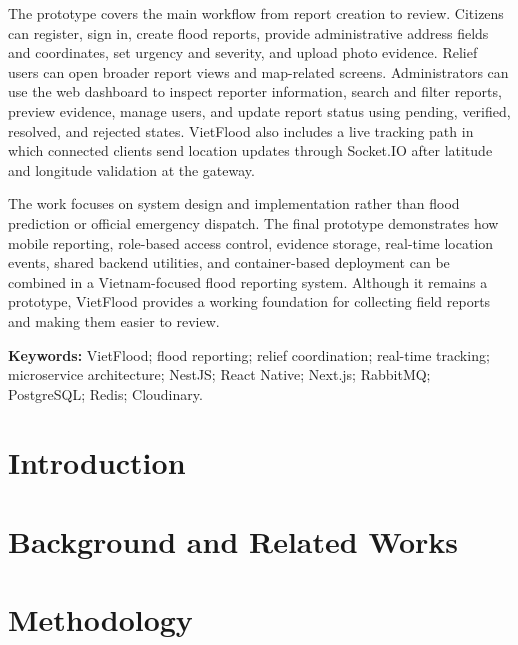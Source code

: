 \documentclass[12pt, twoside]{report}
\begin{document}
The prototype covers the main workflow from report creation to review. Citizens can register, sign in, create flood reports, provide administrative address fields and coordinates, set urgency and severity, and upload photo evidence. Relief users can open broader report views and map-related screens. Administrators can use the web dashboard to inspect reporter information, search and filter reports, preview evidence, manage users, and update report status using pending, verified, resolved, and rejected states. VietFlood also includes a live tracking path in which connected clients send location updates through Socket.IO after latitude and longitude validation at the gateway.

The work focuses on system design and implementation rather than flood prediction or official emergency dispatch. The final prototype demonstrates how mobile reporting, role-based access control, evidence storage, real-time location events, shared backend utilities, and container-based deployment can be combined in a Vietnam-focused flood reporting system. Although it remains a prototype, VietFlood provides a working foundation for collecting field reports and making them easier to review.

\noindent\textbf{Keywords:} VietFlood; flood reporting; relief coordination; real-time tracking; microservice architecture; NestJS; React Native; Next.js; RabbitMQ; PostgreSQL; Redis; Cloudinary.






\chapter{Introduction}
\setcounter{page}{1}


\chapter{Background and Related Works}



\chapter{Methodology}

\end{document}

